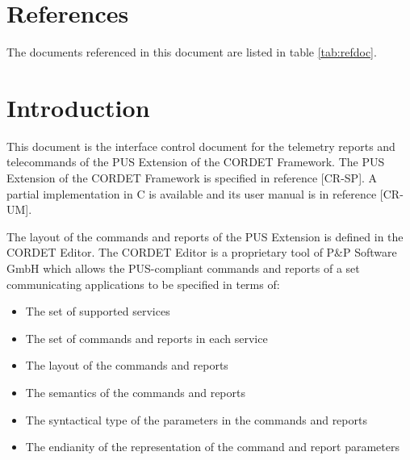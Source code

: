 \documentclass{pnp_article}
\begin{document}
\maketitle

\maketitle

\newpage
\tableofcontents






\section{References}
The documents referenced in this document are listed in table \ref{tab:refdoc}.

\listofreferencedocs{\PxIc}

\section{Introduction}
This document is the interface control document for the telemetry reports and telecommands of the PUS Extension of the CORDET Framework. The PUS Extension of the CORDET Framework is specified in reference [CR-SP]. A partial implementation in C is available and its user manual is in reference [CR-UM].

The layout of the commands and reports of the PUS Extension is defined in the CORDET Editor. The CORDET Editor is a proprietary tool of P\&P Software GmbH which allows the PUS-compliant commands and reports of a set communicating applications to be specified in terms of:

\begin{itemize}
\item The set of supported services 
\item The set of commands and reports in each service
\item The layout of the commands and reports 
\item The semantics of the commands and reports
\item The syntactical type of the parameters in the commands and reports
\item The endianity of the representation of the command and report parameters
\end{itemize}
\end{document}
